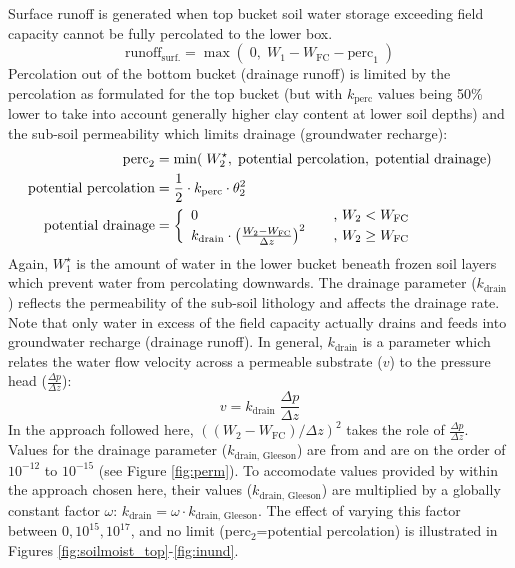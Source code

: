 Surface runoff is generated when top bucket soil water storage exceeding field capacity cannot be fully percolated to the lower box.
\begin{equation}
\text{runoff}_{\text{surf.}}= \max(\;0,\; W_1 - W_{\text{FC}} - \text{perc}_1\;)
\label{eq:runoffsurf}
\end{equation}
Percolation out of the bottom bucket (drainage runoff) is limited by the percolation as formulated for the top bucket (but with $k_{\text{perc}}$ values being 50\% lower to take into account generally higher clay content at lower soil depths) and the sub-soil permeability which limits drainage (groundwater recharge):
\begin{align}
\text{perc}_2 &= \min(\; W_2^{\star}, \; \text{potential percolation}, \; \text{potential drainage} )\\
\text{potential percolation} &= \frac{1}{2}\cdot k_{\text{perc}}\cdot \theta_2^2 \\
\text{potential drainage} &= \left\{
\begin{array}{l l}
    0 & \quad \text{, $W_2 < W_{\text{FC}}$}\\
    k_{\text{drain}} \cdot \left(\frac{ W_2 - W_{\text{FC}} }{\Delta z}\right)^2 & \quad \text{, $W_2 \ge W_{\text{FC}}$}
  \end{array} \right.
\end{align}
Again, $W_1^{\star}$ is the amount of water in the lower bucket beneath frozen soil layers which prevent water from percolating downwards. The drainage parameter ($k_{\text{drain}}$) reflects the permeability of the sub-soil lithology and affects the drainage rate. Note that only water in excess of the field capacity actually drains and feeds into groundwater recharge (drainage runoff). In general, $k_{\text{drain}}$ is a parameter which relates the water flow velocity across a permeable substrate ($v$) to the pressure head ($\frac{\Delta p}{\Delta z}$):
\begin{equation}
v = k_{\text{drain}} \; \frac{\Delta p}{\Delta z}
\end{equation}
In the approach followed here, $( ( W_2 - W_{\text{FC}} ) / \Delta z )^2$ takes the role of $\frac{\Delta p}{\Delta z}$. Values for the drainage parameter ($k_{\text{drain, Gleeson}}$) are from \citet{gleeson11grl} and are on the order of $10^{-12}$ to $10^{-15}$ (see Figure \ref{fig:perm}). To accomodate values provided by \citet{gleeson11grl} within the approach chosen here, their values ($k_{\text{drain, Gleeson}}$) are multiplied by a globally constant factor $\omega$: $k_{\text{drain}}=\omega \cdot k_{\text{drain, Gleeson}}$. The effect of varying this factor between $0, 10^{15}, 10^{17}$, and no limit (perc$_2$=potential percolation) is illustrated in Figures \ref{fig:soilmoist_top}-\ref{fig:inund}.
